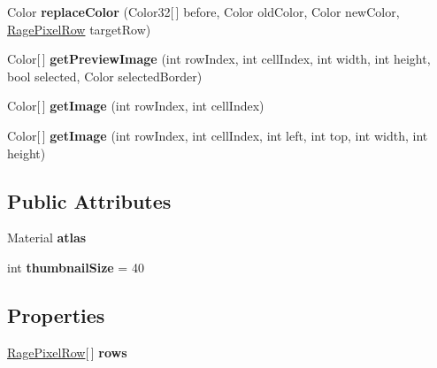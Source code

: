 \begin{DoxyCompactItemize}
\item 
\hypertarget{class_rage_pixel_sprite_sheet_aecfb7ff55fee7915eed484d07fd4beee}{Color {\bfseries replace\-Color} (Color32\mbox{[}$\,$\mbox{]} before, Color old\-Color, Color new\-Color, \hyperlink{class_rage_pixel_row}{Rage\-Pixel\-Row} target\-Row)}\label{class_rage_pixel_sprite_sheet_aecfb7ff55fee7915eed484d07fd4beee}

\item 
\hypertarget{class_rage_pixel_sprite_sheet_a1b3c548164ced39b6ccb469f58be9f46}{Color\mbox{[}$\,$\mbox{]} {\bfseries get\-Preview\-Image} (int row\-Index, int cell\-Index, int width, int height, bool selected, Color selected\-Border)}\label{class_rage_pixel_sprite_sheet_a1b3c548164ced39b6ccb469f58be9f46}

\item 
\hypertarget{class_rage_pixel_sprite_sheet_aee9d6159447f59b0ac1aa8608507cbf2}{Color\mbox{[}$\,$\mbox{]} {\bfseries get\-Image} (int row\-Index, int cell\-Index)}\label{class_rage_pixel_sprite_sheet_aee9d6159447f59b0ac1aa8608507cbf2}

\item 
\hypertarget{class_rage_pixel_sprite_sheet_ae2f0ce120f4f5489b631254c1b4fe1c0}{Color\mbox{[}$\,$\mbox{]} {\bfseries get\-Image} (int row\-Index, int cell\-Index, int left, int top, int width, int height)}\label{class_rage_pixel_sprite_sheet_ae2f0ce120f4f5489b631254c1b4fe1c0}

\end{DoxyCompactItemize}
\subsection*{Public Attributes}
\begin{DoxyCompactItemize}
\item 
\hypertarget{class_rage_pixel_sprite_sheet_a802f55e0ff17565a85c4407c33c0099b}{Material {\bfseries atlas}}\label{class_rage_pixel_sprite_sheet_a802f55e0ff17565a85c4407c33c0099b}

\item 
\hypertarget{class_rage_pixel_sprite_sheet_a1888bb9e536725e355e468b134683e30}{int {\bfseries thumbnail\-Size} = 40}\label{class_rage_pixel_sprite_sheet_a1888bb9e536725e355e468b134683e30}

\end{DoxyCompactItemize}
\subsection*{Properties}
\begin{DoxyCompactItemize}
\item 
\hypertarget{class_rage_pixel_sprite_sheet_a3f5b1ca6150b8aa47a899cc36c1fd8da}{\hyperlink{class_rage_pixel_row}{Rage\-Pixel\-Row}\mbox{[}$\,$\mbox{]} {\bfseries rows}}\label{class_rage_pixel_sprite_sheet_a3f5b1ca6150b8aa47a899cc36c1fd8da}

\end{DoxyCompactItemize}


